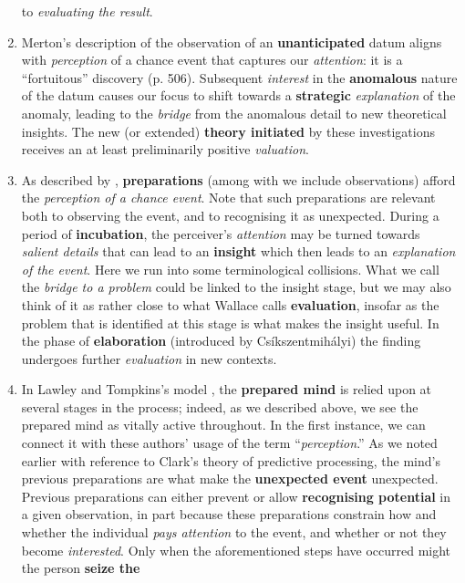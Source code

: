 \begin{enumerate}[label=(\arabic*)]
  to \emph{evaluating the result}.
\item Merton's \cite{merton1948bearing} description of
  the observation of an \textbf{unanticipated} datum aligns with
  \emph{perception} of a chance event that captures our
  \emph{attention}: it is a ``fortuitous'' discovery (p. 506).
  Subsequent \emph{interest} in the \textbf{anomalous} nature of the
  datum causes our focus to shift towards a \textbf{strategic}
  \emph{explanation} of the anomaly, leading to the \emph{bridge} from
  the anomalous detail to new theoretical insights.  The new (or
  extended) \textbf{theory initiated} by these investigations receives
  an at least preliminarily positive \emph{valuation}.
\item As described by \citet{wallas1926art}, \textbf{preparations}
  (among with we include observations) afford the
  \emph{perception of a chance event}.  Note that such preparations
  are relevant both to observing the event, and to recognising it as
  unexpected.  During a period of \textbf{incubation}, the perceiver's
  \emph{attention} may be turned towards \emph{salient details} that
  can lead to an \textbf{insight} which then leads to an
  \emph{explanation of the event}.  Here we run into some
  terminological collisions.  What we call the \emph{bridge to a
    problem} could be linked to the insight stage, but we may also
  think of it as rather close to what Wallace calls \textbf{evaluation},
  insofar as the problem that is identified at this stage is what makes
  the insight useful.  In the phase of \textbf{elaboration} (introduced
  by Cs\'ikszentmih\'alyi) the finding undergoes
  further \emph{evaluation} in new contexts.
\item In Lawley and Tompkins's model \cite{lawley2008maximising}, the
  \textbf{prepared mind} is relied upon at several stages in the
  process; indeed, as we described above, we see the prepared mind as
  vitally active throughout.  In the first instance, we can connect it
  with these authors' usage of the term ``\emph{perception}.''  As we
  noted earlier with reference to Clark's theory of predictive
  processing, the mind's previous preparations are what make the
  \textbf{unexpected event} unexpected.  Previous preparations can
  either prevent or allow \textbf{recognising potential} in a given
  observation, in part because these preparations constrain how and
  whether the individual \emph{pays attention} to the event, and
  whether or not they become \emph{interested}. Only when the
  aforementioned steps have occurred might the person \textbf{seize the
}
\end{enumerate}

